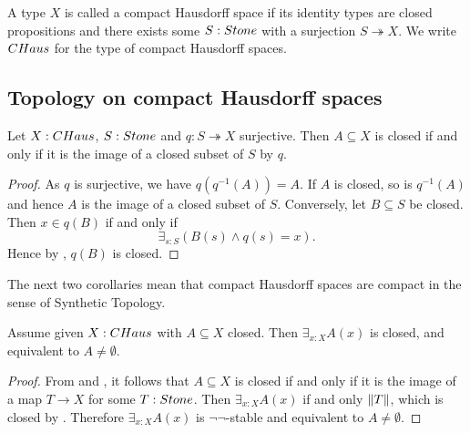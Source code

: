\begin{definition}
  A type $X$ is called a compact Hausdorff space if its identity types are closed propositions and there exists some $S:\Stone$ with a surjection $S\twoheadrightarrow X$. We write $\CHaus$ for the type of compact Hausdorff spaces.
\end{definition}


\subsection{Topology on compact Hausdorff spaces}

\begin{lemma}\label{CompactHausdorffClosed}
  Let $X:\CHaus$, $S:\Stone$ and $q:S\twoheadrightarrow X$ surjective.
  Then $A\subseteq X$ is closed if and only if it is the image of a closed subset of $S$ by $q$. 
\end{lemma}
\begin{proof}
  As $q$ is surjective, we have $q(q^{-1}(A)) = A$.
  If $A$ is closed, so is $q^{-1}(A)$ and 
  hence $A$ is the image of a closed subset of $S$. 
  Conversely, let $B\subseteq S$ be closed. Then $x\in q(B)$ if and only if
   \[\exists_{s:S} (B(s) \wedge q(s) = x).\]
   Hence by , $q(B)$ is closed. 
\end{proof}

The next two corollaries mean that compact Hausdorff spaces are compact in the sense of Synthetic Topology.

\begin{corollary}\label{InhabitedClosedSubSpaceClosedCHaus}
Assume given $X:\Chaus$ with $A\subseteq X$ closed. Then $\exists_{x:X} A(x)$ is closed, and equivalent to $A \neq \emptyset$. 
\end{corollary}

\begin{proof}
From  and , it follows that $A\subseteq X$ is closed if and only if it is the image of a map $T\to X$ for some $T:\Stone$. Then $\exists_{x:X} A(x)$ if and only $\lVert T \rVert$, which is closed by . Therefore $\exists_{x:X} A(x)$ is $\neg\neg$-stable and equivalent to $A \neq \emptyset$. 
\end{proof}


